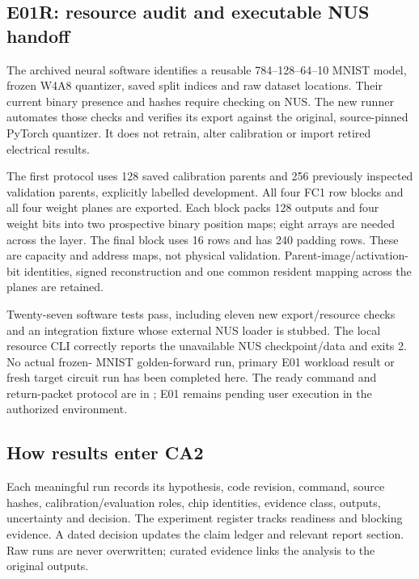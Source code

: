 \subsection{E01R: resource audit and executable NUS handoff}

The archived neural software identifies a reusable 784--128--64--10 MNIST model,
frozen W4A8 quantizer, saved split indices and raw dataset locations. Their current
binary presence and hashes require checking on NUS. The new runner automates those
checks and verifies its export against the original, source-pinned PyTorch quantizer.
It does not retrain, alter calibration or import retired electrical results.

The first protocol uses 128 saved calibration parents and 256 previously inspected
validation parents, explicitly labelled development. All four FC1 row blocks and all
four weight planes are exported. Each block packs 128 outputs and four weight bits
into two prospective \target{} binary position maps; eight arrays are needed across
the layer. The final block uses 16 rows and has 240 padding rows. These are capacity
and address maps, not physical validation. Parent-image/activation-bit identities,
signed reconstruction and one common resident mapping across the planes are retained.

Twenty-seven software tests pass, including eleven new export/resource checks and
an integration fixture whose external NUS loader is stubbed. The local resource CLI
correctly reports the unavailable NUS checkpoint/data and exits 2. No actual frozen-
MNIST golden-forward run, primary E01 workload result or fresh target circuit run has
been completed here. The ready command and return-packet protocol are in
; E01 remains pending user execution in the authorized environment.

\subsection{How results enter CA2}

Each meaningful run records its hypothesis, code revision, command, source hashes,
calibration/evaluation roles, chip identities, evidence class, outputs, uncertainty and
decision. The experiment register tracks readiness and blocking evidence. A dated
decision updates the claim ledger and relevant report section. Raw runs are never
overwritten; curated evidence links the analysis to the original outputs.
